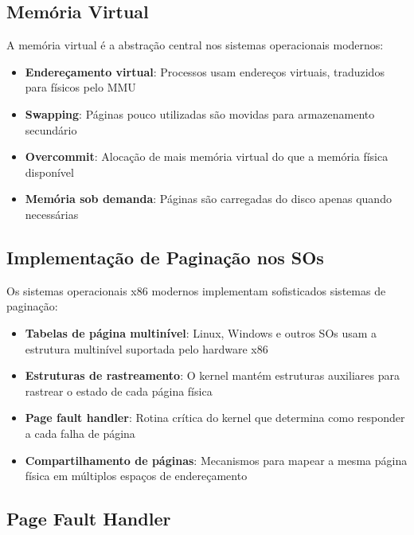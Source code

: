 \subsection{Memória Virtual}
\label{subsec:memoria_virtual}

A memória virtual é a abstração central nos sistemas operacionais modernos:

\begin{itemize}
    \item \textbf{Endereçamento virtual}: Processos usam endereços virtuais, traduzidos para físicos pelo MMU

    \item \textbf{Swapping}: Páginas pouco utilizadas são movidas para armazenamento secundário

    \item \textbf{Overcommit}: Alocação de mais memória virtual do que a memória física disponível

    \item \textbf{Memória sob demanda}: Páginas são carregadas do disco apenas quando necessárias
\end{itemize}

\subsection{Implementação de Paginação nos SOs}
\label{subsec:impl_paginacao}

Os sistemas operacionais x86 modernos implementam sofisticados sistemas de paginação:

\begin{itemize}
    \item \textbf{Tabelas de página multinível}: Linux, Windows e outros SOs usam a estrutura multinível suportada pelo hardware x86

    \item \textbf{Estruturas de rastreamento}: O kernel mantém estruturas auxiliares para rastrear o estado de cada página física

    \item \textbf{Page fault handler}: Rotina crítica do kernel que determina como responder a cada falha de página

    \item \textbf{Compartilhamento de páginas}: Mecanismos para mapear a mesma página física em múltiplos espaços de endereçamento
\end{itemize}

\subsection{Page Fault Handler}
\label{subsec:page_fault_handler}

